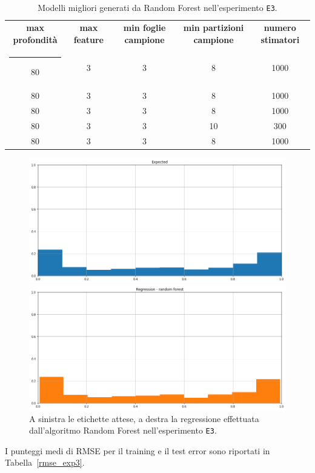 \documentclass[12pt]{report}
\makeatletter
\theoremstyle{definition}
\newcommand{\thickhline}{%
    \noalign {\ifnum 0=`}\fi \hrule height 1pt
    \futurelet \reserved@a \@xhline
}
\makeatother
\begin{document}
\begin{table}
\centering
\begin{adjustbox}{max width=\textwidth}
 \begin{tabular}{|c|c|c|c|c|} 
 \hline
\textbf{max profondità} & \textbf{max feature} & \textbf{min foglie campione} & \textbf{min partizioni campione} & \textbf{numero stimatori}
\\ [0.5ex] 
 \thickhline
 80 & 3 & 3 & 8 & 1000 \\ 
 80 & 3 & 3 & 8 & 1000 \\ 
 80 & 3 & 3 & 8 & 1000 \\ 
 80 & 3 & 3 & 10 & 300 \\ 
 80 & 3 & 3 & 8 & 1000 \\ 
 \hline
\end{tabular}
\end{adjustbox}
\caption{Modelli migliori generati da Random Forest nell'esperimento \texttt{E3}.}
\label{models_rf_exp3}
\end{table}

\begin{figure}
\centering
    \begin{minipage}{0.48\textwidth}
        \includegraphics[width=\linewidth]{images/experiment_beta05_disgiunti/expected_memberships.png}
    \end{minipage}
    \begin{minipage}{0.48\textwidth}
        \includegraphics[width=\linewidth]{images/experiment_beta05_disgiunti/prediction_regression_rf.png}
    \end{minipage}
    \caption{A sinistra le etichette attese, a destra la regressione effettuata dall'algoritmo Random Forest nell'esperimento \texttt{E3}.}
    \label{rf_exp3}
\end{figure} 
I punteggi medi di RMSE per il training e il test error sono riportati in Tabella~\ref{rmse_exp3}.
\end{document}
